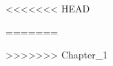 \documentclass[a4paper]{report}
\begin{document}


\tableofcontents
















\listoffigures

\lstlistoflistings


 
<<<<<<< HEAD
\listoffigures
=======

>>>>>>> Chapter_1
\end{document}
